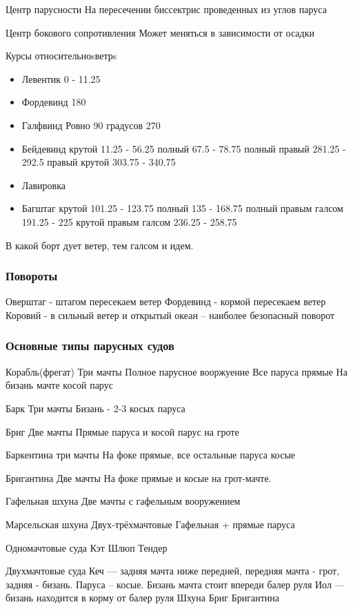 \documentclass{article}        %
\begin{document}
Центр парусности
На пересечении биссектрис проведенных из углов паруса

Центр бокового сопротивления
Может меняться в зависимости от осадки	

Курсы относительноsветрs

\begin{itemize}
\item Левентик
	0 - 11.25 
\item Фордевинд
	180 
\item Галфвинд
	Ровно 90 градусов
	270
\item Бейдевинд
	крутой 11.25 - 56.25
	полный 67.5 - 78.75
	полный правый 281.25 - 292.5
	правый крутой 303.75 - 340.75
\item Лавировка
\item Багштаг
	крутой 101.25 - 123.75
	полный 135 - 168.75
	полный правым галсом 191.25 - 225
	крутой правым галсом 236.25 - 258.75
\end{itemize}

В какой борт дует ветер, тем галсом и идем.

\subsubsection{Повороты}
Оверштаг - штагом пересекаем ветер
Фордевинд - кормой пересекаем ветер
Коровий - в сильный ветер и открытый океан -- наиболее безопасный поворот

\subsubsection{Основные типы парусных судов}
Корабль(фрегат)
Три мачты
Полное парусное вооржуение
Все паруса прямые
На бизань мачте косой парус

Барк
Три мачты
Бизань - 2-3 косых паруса

Бриг 
Две мачты
Прямые паруса и косой парус на гроте

Баркентина
три мачты
На фоке прямые, все остальные паруса косые

Бригантина
Две мачты
На фоке прямые и косые на грот-мачте.

Гафельная шхуна
Две мачты с гафельным вооружением

Марсельская шхуна
Двух-трёхмачтовые
Гафельная + прямые паруса



Одномачтовые суда
Кэт
Шлюп
Тендер

Двухмачтовые суда
Кеч --- задняя мачта ниже передней, передняя мачта - грот, задняя - бизань. Паруса -- косые. Бизань мачта стоит впереди балер руля
Иол --- бизань находится в корму от балер руля 
Шхуна
Бриг
Бригантина
\end{document}
